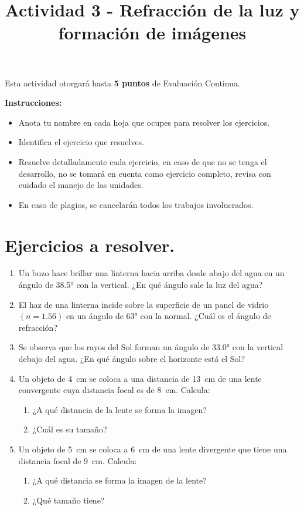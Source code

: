 \documentclass[14pt]{extarticle}
\title{\vspace*{-2cm} Actividad 3 - Refracción de la luz y formación de imágenes \vspace{-5ex}}
\date{}
\begin{document}
\maketitle

Esta actividad otorgará hasta \textbf{5 puntos} de Evaluación Continua.
\vspace*{0.5cm}

\textbf{Instrucciones: }
\begin{itemize}
\item Anota tu nombre en cada hoja que ocupes para resolver los ejercicios.
\item Identifica el ejercicio que resuelves.
\item Resuelve detalladamente cada ejercicio, en caso de que no se tenga el desarrollo, no se tomará en cuenta como ejercicio completo, revisa con cuidado el manejo de las unidades.
\item En caso de plagios, se cancelarán todos los trabajos involucrados.
\end{itemize}


\section*{Ejercicios a resolver.}

\begin{enumerate}
\item Un buzo hace brillar una linterna hacia arriba desde abajo del agua en un ángulo de \ang{38.5} con la vertical. ¿En qué ángulo sale la luz del agua?
\item El haz de una linterna incide sobre la superficie de un panel de vidrio $(n = 1.56)$ en un ángulo de \ang{63} con la normal. ¿Cuál es el ángulo de refracción?
\item Se observa que los rayos del Sol forman un ángulo de \ang{33.0} con la vertical debajo del agua. ¿En qué ángulo sobre el horizonte está el Sol?
\item Un objeto de \SI{4}{\centi\meter} se coloca a una distancia de \SI{13}{\centi\meter} de una lente convergente cuya distancia focal es de \SI{8}{\centi\meter}. Calcula:
\begin{enumerate}
\item ¿A qué distancia de la lente se forma la imagen?
\item ¿Cuál es su tamaño?
\end{enumerate}
\item Un objeto de \SI{5}{\centi\meter} se coloca a \SI{6}{\centi\meter} de una lente divergente que tiene una distancia focal de \SI{9}{\centi\meter}. Calcula:
\begin{enumerate}
\item ¿A qué distancia se forma la imagen de la lente?
\item ¿Qué tamaño tiene?
\end{enumerate}
\end{enumerate}
\end{document}
